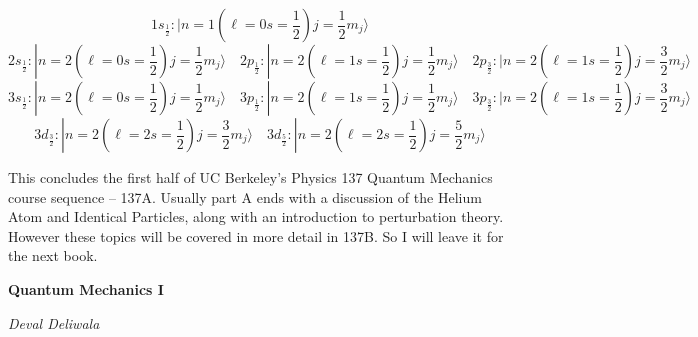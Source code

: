 \[ 1s_{\frac{1}{2}}: |n=1 (\ell = 0 s = \frac{1}{2}) j = \frac{1}{2}m_j
\rangle \] 
\[ 2s_{\frac{1}{2}}: |n=2 ( \ell = 0 s = \frac{1}{2} ) j = \frac{1}{2} m_j
  \rangle \quad 2p_{\frac{1}{2}}: |n = 2 ( \ell=1 s = \frac{1}{2} )
  j = \frac{1}{2} m_j \rangle \quad 2p_{\frac{3}{2}}: |n = 2 ( \ell
= 1 s = \frac{1}{2} ) j = \frac{3}{2}m_j \rangle \] 
\[ 3s_{\frac{1}{2}}: |n = 2 (\ell = 0 s = \frac{1}{2} ) j = \frac{1}{2}m_j
  \rangle \quad 3p_{\frac{1}{2}}: |n = 2 ( \ell = 1 s = \frac{1}{2} )
  j = \frac{1}{2} m_j \rangle \quad 3p_{\frac{3}{2}}: |n=2 (\ell
= 1 s = \frac{1}{2} ) j = \frac{3}{2}m_j \rangle \] 
\[ 3d_{\frac{3}{2}}: |n=2 ( \ell = 2 s = \frac{1}{2} ) j = \frac{3}{2}m_j
  \rangle \quad 3d_{\frac{5}{2}}: |n = 2 (\ell = 2s=\frac{1}{2})
j = \frac{5}{2} m_j \rangle \] \vspace{3px} 


This concludes the first half of UC Berkeley's Physics 137 Quantum Mechanics
course sequence -- 137A. Usually part A ends with a discussion of the Helium Atom
and Identical Particles, along with an introduction to perturbation theory. However
these topics will be covered in more detail in 137B. So I will leave it for the next book. 

\vfill 

\begin{center}
  \textbf{Quantum Mechanics I} 
\end{center}

\begin{center}
  \textit{Deval Deliwala}
\end{center}
